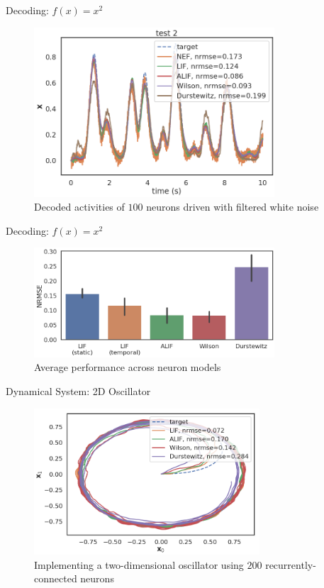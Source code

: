 \documentclass[aspectratio=169]{beamer}
\begin{document}
\begin{frame}{Decoding: $f(x) = x^2$}
\begin{figure}
    \centering
    \includegraphics[width=0.8\textwidth]{media/function_test2_order2.png}
    \caption{Decoded activities of $100$ neurons driven with filtered white noise}
\end{figure}
\end{frame}
\begin{frame}{Decoding: $f(x) = x^2$}
\begin{figure}
    \centering
    \includegraphics[width=0.8\textwidth]{media/function_barplots_order2.png}
    \caption{Average performance across neuron models}
\end{figure}
\end{frame}

\begin{frame}{Dynamical System: 2D Oscillator}
\begin{figure}
    \centering
    \includegraphics[width=0.75\textwidth]{media/oscillator_state_order2_old.png}
    \caption{Implementing a two-dimensional oscillator using $200$ recurrently-connected neurons}
\end{figure}
\end{frame}
\end{document}
